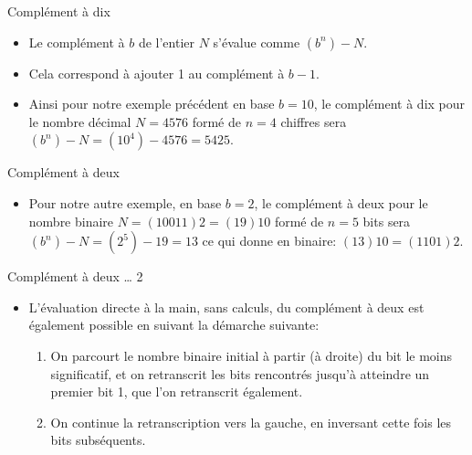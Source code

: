\documentclass[presentation]{beamer}
\begin{document}
\begin{frame}[label={sec:org28fdcfe}]{Complément à dix}
\begin{itemize}
\item Le complément à \(b\) de l'entier \(N\) s'évalue comme \((b^n)-N\).

\item Cela correspond à ajouter 1 au complément à \(b-1\).

\item Ainsi pour notre exemple précédent en base \(b=10\), le complément à dix pour le nombre décimal \(N = 4576\) formé de \(n=4\) chiffres sera \((b^n)-N = (10^4) - 4576 = 5425\).
\end{itemize}
\end{frame}

\begin{frame}[label={sec:org58fd942}]{Complément à deux}
\begin{itemize}
\item Pour notre autre exemple, en base \(b=2\), le complément à deux pour le nombre binaire \(N = (10011)2 = (19)10\) formé de \(n=5\) bits sera \((b^n)-N = (2^5) - 19 = 13\) ce qui donne en binaire: \((13)10 = (1101)2\).
\end{itemize}
\end{frame}

\begin{frame}[label={sec:orgb8afa2a}]{Complément à deux \ldots{} 2}
\begin{itemize}
\item L'évaluation directe à la main, sans calculs, du complément à deux est également possible en suivant la démarche suivante:
\begin{enumerate}
\item On parcourt le nombre binaire initial à partir (à droite) du bit le moins significatif, et on retranscrit les bits rencontrés jusqu'à atteindre un premier bit 1, que l'on retranscrit également.
\item On continue la retranscription vers la gauche, en inversant cette fois les bits subséquents.
\end{enumerate}
\end{itemize}
\end{frame}
\end{document}
